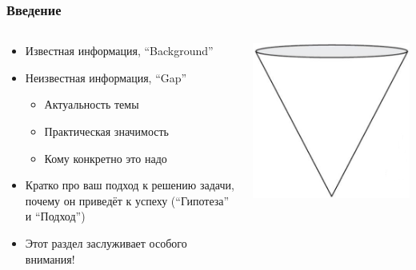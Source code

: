 \documentclass[xetex,mathserif,serif]{beamer}
\begin{document}
    \begin{frame}
        \frametitle{Введение}
        \begin{columns}
            \begin{column}{0.6\textwidth}
                \begin{itemize}
                    \item Известная информация, \enquote{Background}
                    \item Неизвестная информация, \enquote{Gap}
                    \begin{itemize}
                        \item Актуальность темы
                        \item Практическая значимость
                        \item Кому конкретно это надо
                    \end{itemize}
                    \item Кратко про ваш подход к решению задачи, почему он приведёт к успеху (\enquote{Гипотеза} и \enquote{Подход})
                    \item Этот раздел заслуживает особого внимания!
                \end{itemize}
            \end{column}
            \begin{column}{0.4\textwidth}
                \begin{center}
                    \includegraphics[width=\textwidth]{introductionCone.png}
                \end{center}
            \end{column}
        \end{columns}
    \end{frame}
\end{document}
